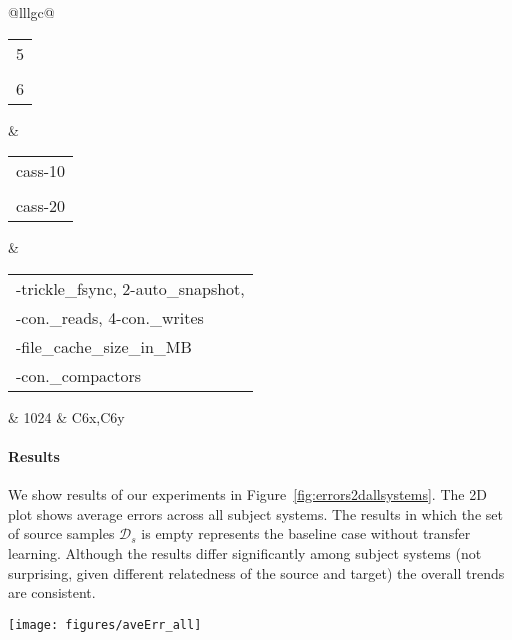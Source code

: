 \begin{table}[t]
{\begin{threeparttable}
\begin{tabular}{@{}lllgc@{}}
				  \\ \midrule
				\begin{tabular}[c]{@{}l@{}}5 \\ \\ 6\end{tabular} & \begin{tabular}[c]{@{}l@{}} {\sf cass-10 } \\ \\ {\sf cass-20 }\end{tabular}      & \begin{tabular}[c]{@{}l@{}}{\sf 1-trickle\_fsync, 2-auto\_snapshot,} \\ {\sf 3-con.\_reads, 4-con.\_writes} \\ {\sf 5-file\_cache\_size\_in\_MB}\\ {\sf 6-con.\_compactors} \end{tabular}     & 1024 & C6x,C6y \\ %
				\bottomrule
			\end{tabular}
		\end{threeparttable}}
	\end{table}




\paragraph*{Results}
We show results of our experiments in Figure~\ref{fig:errors2dallsystems}. The 2D plot shows average errors across all subject systems.
The results in which the set of source samples $\mathcal{D}_s$ is empty represents the baseline case without transfer learning.
Although the results differ significantly among subject systems (not surprising, given different relatedness of the source and target) the overall trends are consistent.



\begin{figure*}[t]
	\begin{center}
		\texttt{[image: figures/aveErr\_all]}
		\caption{Prediction accuracy for (a) CoBot, (b) {\sf \small WC}, (c) {\sf \small SOL}, (d) {\sf \small RS}, (e) {\sf \small cass} (hardware change), (f) {\sf \small cass} (DB size change).}
		\label{fig:errors2dallsystems}
	\end{center}
\end{figure*}


